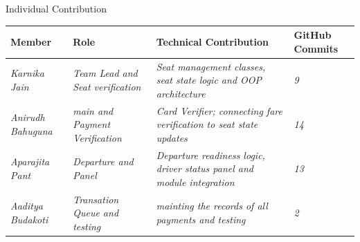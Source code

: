 \documentclass[aspectratio=169,11pt]{beamer}
\newcommand{\smallnote}[1]{%
\vspace{0.08cm}
{\scriptsize\color{GEUGrey}#1}
}
\newcommand{\placeholder}[1]{%
\textit{\color{GEUGrey}#1}
}
\begin{document}
\begin{frame}{Individual Contribution}

\scriptsize

\begin{center}

\renewcommand{\arraystretch}{1.35}

\begin{tabularx}{.96\textwidth}
{@{}p{2.0cm}p{2.0cm}X p{1.6cm}@{}}

\toprule
Member &
Role &
Technical Contribution &
GitHub Commits\\
\midrule

\placeholder{Karnika Jain} &
\placeholder{Team Lead and Seat verification} &
\placeholder{Seat management classes, seat state logic and OOP architecture} &
\placeholder{9}\\

\placeholder{Anirudh Bahuguna} &
\placeholder{main and Payment Verification} &
\placeholder{Card Verifier; connecting fare verification to seat state updates} &
\placeholder{14}\\

\placeholder{Aparajita Pant} &
\placeholder{Departure and Panel} &
\placeholder{Departure readiness logic, driver status panel and module integration} &
\placeholder{13}\\

\placeholder{Aaditya Budakoti} &
\placeholder{Transation Queue and testing} &
\placeholder{mainting the records of all payments and testing} &
\placeholder{2}\\

\bottomrule

\end{tabularx}

\end{center}

\vspace{3mm}



\end{frame}
\end{document}
